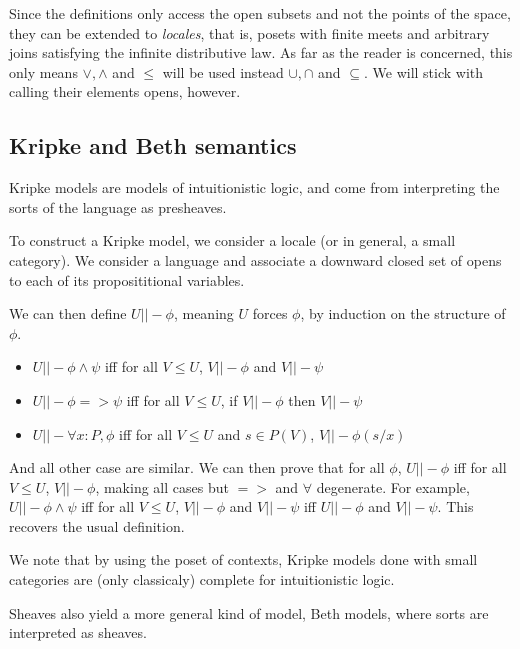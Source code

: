 \documentclass[11pt]{article}
\newcommand{\0}{\mathbf{0}}
\newcommand{\1}{\mathbf{1}}
\begin{document}
Since the definitions only access the open subsets and not the points of the space, they can be extended to \emph{locales}, that is, posets with finite meets and arbitrary joins satisfying the infinite distributive law. As far as the reader is concerned, this only means $\vee,\wedge$ and $\leq$ will be used instead $\cup,\cap$ and $\subseteq$. We will stick with calling their elements opens, however.

\subsection{Kripke and Beth semantics}

Kripke models are models of intuitionistic logic, and come from interpreting the sorts of the language as presheaves.

To construct a Kripke model, we consider a locale (or in general, a small category). We consider a language and associate a downward closed set of opens to each of its proposititional variables.

We can then define $U ||- \phi$, meaning $U$ forces $\phi$, by induction on the structure of $\phi$.
\begin{itemize}
    \item $U ||- \phi \wedge \psi$ iff for all $V\leq U$, $V ||- \phi$ and $V ||- \psi$
    \item $U ||- \phi => \psi$ iff for all $V \leq U$, if $V ||- \phi$ then $V ||- \psi $
    \item $U ||- \forall x : P, \phi$ iff for all $V \leq U$ and $s\in P(V)$, $V ||- \phi(s/x) $
\end{itemize}
And all other case are similar. We can then prove that for all $\phi$, $U||-\phi$ iff for all $V \leq U$, $V ||- \phi$, making all cases but $ => $ and $\forall$ degenerate. For example, $U ||- \phi \wedge \psi$ iff for all $V \leq U$, $ V||- \phi$ and $V ||- \psi$ iff $U||- \phi$ and $V||- \psi$. This recovers the usual definition.

We note that by using the poset of contexts, Kripke models done with small categories are (only classicaly) complete for intuitionistic logic.

Sheaves also yield a more general kind of model, Beth models, where sorts are interpreted as sheaves.
\end{document}
